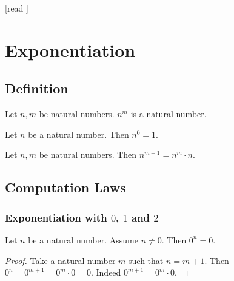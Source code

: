 \documentclass[10pt]{article}
\begin{document}
  \begin{imports}
    \begin{forthel}
      [read ]
    \end{forthel}
  \end{imports}


  \section*{Exponentiation}

  \subsection*{Definition}

  \begin{forthel}
    \begin{signature}[id=ARITHMETIC_09_3663815629602816,printid]
      Let $n, m$ be natural numbers.
      $n^{m}$ is a natural number.
    \end{signature}
  \end{forthel}

  \begin{forthel}
    \begin{axiom}[id=ARITHMETIC_09_5368818025103360,printid]
      Let $n$ be a natural number.
      Then $n^{0} = 1$.
    \end{axiom}
  \end{forthel}

  \begin{forthel}
    \begin{axiom}[id=ARITHMETIC_09_4140498660884480,printid]
      Let $n, m$ be natural numbers.
      Then $n^{m + 1} = n^{m} \cdot n$.
    \end{axiom}
  \end{forthel}


  \subsection*{Computation Laws}

  \subsubsection*{Exponentiation with $0$, $1$ and $2$}

  \begin{forthel}
    \begin{proposition}[id=ARITHMETIC_09_4673644676513792,printid]
      Let $n$ be a natural number.
      Assume $n \neq 0$.
      Then $0^{n} = 0$.
    \end{proposition}
    \begin{proof}
      Take a natural number $m$ such that $n = m + 1$.
      Then $0^{n}
        = 0^{m + 1}
        = 0^{m} \cdot 0
        = 0$.
      Indeed $0^{m + 1} = 0^{m} \cdot 0$.
    \end{proof}
  \end{forthel}
\end{document}

